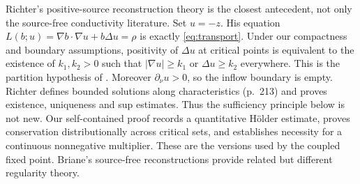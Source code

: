 \documentclass[11pt,a4paper]{article}
\theoremstyle{definition}\newtheorem{definition}[theorem]{Definition}
\theoremstyle{remark}\newtheorem{remark}[theorem]{Remark}
\begin{document}
Richter's positive-source reconstruction theory \cite{Richter1981} is the
closest antecedent, not only the source-free conductivity literature.
Set $u=-z$. His equation $L(b;u)=\nabla b\cdot\nabla u+b\Delta u=\rho$
is exactly \eqref{eq:transport}. Under our compactness and boundary assumptions,
positivity of $\Delta u$ at critical points is equivalent to the existence of
$k_1,k_2>0$ such that $|\nabla u|\geq k_1$ or $\Delta u\geq k_2$ everywhere.
This is the partition hypothesis of \cite[Theorem 1, pp.~216--217]{Richter1981}.
Moreover $\partial_\nu u>0$, so the inflow boundary is empty.
Richter defines bounded solutions along characteristics (p.~213) and proves
existence, uniqueness and sup estimates. Thus the sufficiency principle below
is not new. Our self-contained proof records a quantitative H\"older estimate,
proves conservation distributionally across critical sets, and establishes
necessity for a continuous nonnegative multiplier. These are the versions used
by the coupled fixed point. Briane's source-free reconstructions
\cite{Briane2014,Briane2018} provide related but different regularity theory.
\end{document}
